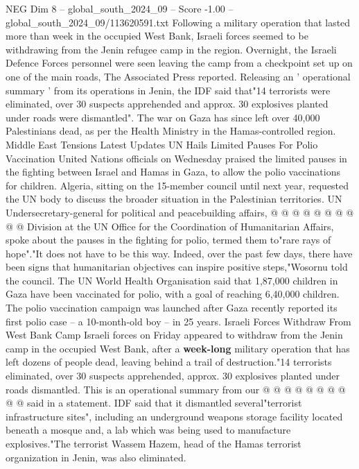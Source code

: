 \begin{textsample}{NEG Dim 8 – global\_south\_2024\_09 – Score -1.00 – global\_south\_2024\_09/113620591.txt}  \label{ex:f8_neg_163}
Following a military operation that lasted more than week in the occupied West Bank, Israeli forces seemed to be withdrawing from the Jenin refugee camp in the region.
Overnight, the Israeli Defence Forces personnel were seen leaving the camp from a checkpoint set up on one of the main roads, The Associated Press reported.
Releasing an ' operational summary ' from its operations in Jenin, the IDF said that"14 terrorists were eliminated, over 30 suspects apprehended and approx. 30 explosives planted under roads were dismantled".
The war on Gaza has since left over 40,000 Palestinians dead, as per the Health Ministry in the Hamas-controlled region.
Middle East Tensions Latest Updates UN Hails Limited Pauses For Polio Vaccination United Nations officials on Wednesday praised the limited pauses in the fighting between Israel and Hamas in Gaza, to allow the polio vaccinations for children.
Algeria, sitting on the 15-member council until next year, requested the UN body to discuss the broader situation in the Palestinian territories.
UN Undersecretary-general for political and peacebuilding affairs, @ @ @ @ @ @ @ @ @ @ Division at the UN Office for the Coordination of Humanitarian Affairs, spoke about the pauses in the fighting for polio, termed them to"rare rays of hope"."It does not have to be this way.
Indeed, over the past few days, there have been signs that humanitarian objectives can inspire positive steps,"Wosornu told the council.
The UN World Health Organisation said that 1,87,000 children in Gaza have been vaccinated for polio, with a goal of reaching 6,40,000 children.
The polio vaccination campaign was launched after Gaza recently reported its first polio case -- a 10-month-old boy -- in 25 years.
Israeli Forces Withdraw From West Bank Camp Israeli forces on Friday appeared to withdraw from the Jenin camp in the occupied West Bank, after a \textbf{week-long} military operation that has left dozens of people dead, leaving behind a trail of destruction."14 terrorists eliminated, over 30 suspects apprehended, approx. 30 explosives planted under roads dismantled.
This is an operational summary from our @ @ @ @ @ @ @ @ @ @ said in a statement.
IDF said that it dismantled several"terrorist infrastructure sites", including an underground weapons storage facility located beneath a mosque and, a lab which was being used to manufacture explosives."The terrorist Wassem Hazem, head of the Hamas terrorist organization in Jenin, was also eliminated.

\end{textsample}
